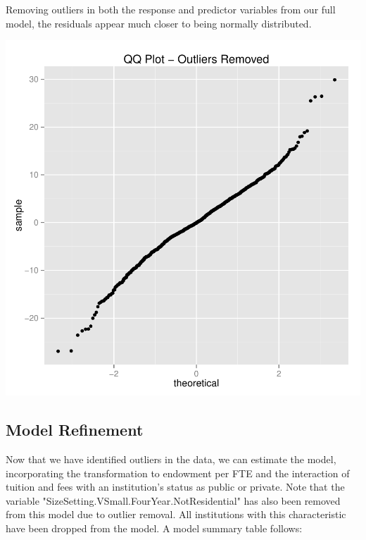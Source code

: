 \documentclass{article}
\begin{document}
\FloatBarrier

Removing outliers in both the response and predictor variables from our full model, the residuals appear much closer to being normally distributed.


\includegraphics{Fig-qqplotnoouts}


\FloatBarrier

\subsection{Model Refinement}

Now that we have identified outliers in the data, we can estimate the model, incorporating the transformation to endowment per FTE and the interaction of tuition and fees with an institution's status as public or private. Note that the variable "SizeSetting.VSmall.FourYear.NotResidential" has also been removed from this model due to outlier removal. All institutions with this characteristic have been dropped from the model. A model summary table follows:
\end{document}
